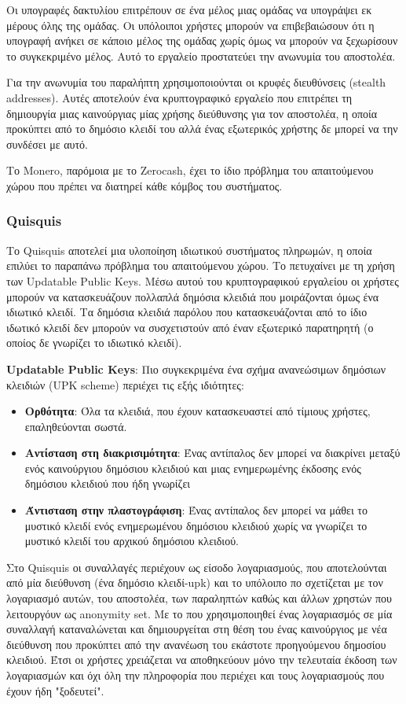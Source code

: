 Οι υπογραφές δακτυλίου επιτρέπουν σε ένα μέλος μιας ομάδας να υπογράψει εκ μέρους όλης της ομάδας. Οι υπόλοιποι χρήστες μπορούν να επιβεβαιώσουν ότι η υπογραφή ανήκει σε κάποιο μέλος της ομάδας χωρίς όμως να μπορούν να ξεχωρίσουν το συγκεκριμένο μέλος. Αυτό το εργαλείο προστατεύει την ανωνυμία του αποστολέα.

Για την ανωνυμία του παραλήπτη χρησιμοποιούνται οι κρυφές διευθύνσεις (stealth addresses). Αυτές αποτελούν ένα κρυπτογραφικό εργαλείο που  επιτρέπει τη δημιουργία μιας καινούργιας μίας χρήσης διεύθυνσης για τον αποστολέα, η οποία προκύπτει από το δημόσιο κλειδί του αλλά ένας εξωτερικός χρήστης δε μπορεί να την συνδέσει με αυτό.

Το Monero, παρόμοια με το Zerocash, έχει το ίδιο πρόβλημα του απαιτούμενου χώρου που πρέπει να διατηρεί κάθε κόμβος του συστήματος.

\subsubsection{Quisquis}
Το Quisquis αποτελεί μια υλοποίηση ιδιωτικού συστήματος πληρωμών, η οποία επιλύει το παραπάνω πρόβλημα του απαιτούμενου χώρου. Το πετυχαίνει με τη χρήση των Updatable Public Keys. Μέσω αυτού του κρυπτογραφικού εργαλείου οι χρήστες μπορούν να κατασκευάζουν πολλαπλά δημόσια κλειδιά που μοιράζονται όμως ένα ιδιωτικό κλειδί. Τα δημόσια κλειδιά παρόλου που κατασκευάζονται από το ίδιο ιδωτικό κλειδί δεν μπορούν να συσχετιστούν από έναν εξωτερικό παρατηρητή (ο οποίος δε γνωρίζει το ιδιωτικό κλειδί). 

\textbf{Updatable Public Keys}:
Πιο συγκεκριμένα ένα σχήμα ανανεώσιμων δημόσιων κλειδιών (UPK scheme) περιέχει τις εξής ιδιότητες:
\begin{itemize}
    \item \textbf{Ορθότητα}: Όλα τα κλειδιά, που έχουν κατασκευαστεί από τίμιους χρήστες, επαληθεύονται σωστά.
    \item \textbf{Αντίσταση στη διακρισιμότητα}: Ένας αντίπαλος δεν μπορεί να διακρίνει μεταξύ ενός καινούργιου δημόσιου κλειδιού και μιας ενημερωμένης έκδοσης ενός δημόσιου κλειδιού που ήδη γνωρίζει
    \item \textbf{Άντισταση στην πλαστογράφιση}: Ένας αντίπαλος δεν μπορεί να μάθει το μυστικό κλειδί ενός ενημερωμένου δημόσιου κλειδιού χωρίς να γνωρίζει το μυστικό κλειδί του αρχικού δημόσιου κλειδιού.
\end{itemize}

Στο Quisquis οι συναλλαγές περιέχουν ως είσοδο λογαριασμούς, που αποτελούνται από μία διεύθυνση (ένα δημόσιο κλειδί-upk) και το υπόλοιπο πο σχετίζεται με τον λογαριασμό αυτών, του αποστολέα, των παραληπτών καθώς και άλλων χρηστών που λειτουργόυν ως anonymity set. Με το που χρησιμοποιηθεί ένας λογαριασμός σε μία συναλλαγή καταναλώνεται και δημιουργείται στη θέση του ένας καινούργιος με νέα διεύθυνση που προκύπτει από την ανανέωση του εκάστοτε προηγούμενου δημοσίου κλειδιού. Έτσι οι χρήστες χρειάζεται να αποθηκεύουν μόνο την τελευταία έκδοση των λογαριασμών και όχι όλη την πληροφορία που περιέχει και τους λογαριασμούς που έχουν ήδη "ξοδευτεί".

